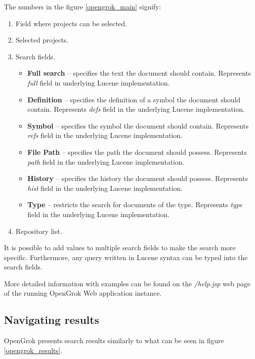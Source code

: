 The numbers in the figure \ref{opengrok_main} signify:
\begin{enumerate}
    \item Field where projects can be selected.
    \item Selected projects.
    \item Search fields.
       \begin{itemize}
        \item \textbf{Full search} – specifies the text the document should contain. Represents \textit{full} field in
        underlying Lucene implementation.
        \item \textbf{Definition} – specifies the definition of a symbol the document should contain.
        Represents \textit{defs} field in the underlying Lucene implementation.
        \item \textbf{Symbol} – specifies the symbol the document should contain.
        Represents \textit{refs} field in the underlying Lucene implementation.
        \item \textbf{File Path} – specifies the path the document should possess.
        Represents \textit{path} field in the underlying Lucene implementation.
        \item \textbf{History} – specifies the history the document should possess.
        Represents \textit{hist} field in the underlying Lucene implementation.
        \item \textbf{Type} – restricts the search for documents of the type.
        Represents \textit{type} field in the underlying Lucene implementation.
       \end{itemize}
    \item Repository list.
\end{enumerate}

It is possible to add values to multiple search fields to make the search more specific. Furthermore, any query written
in Lucene syntax can be typed into the search fields.

More detailed information with examples can be found on the \textit{/help.jsp} web page of the running OpenGrok Web application instance.

\subsection{Navigating results}

OpenGrok presents search results similarly to what can be seen in figure \ref{opengrok_results}.

